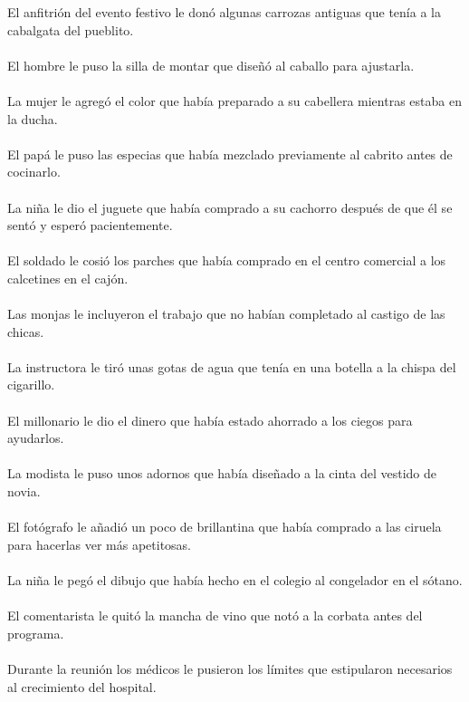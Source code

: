 El anfitri\'{o}n del evento festivo le don\'{o} algunas carrozas antiguas que ten\'{i}a a la cabalgata del pueblito.	\\	\\
El hombre le puso la silla de montar que dise\~{n}\'{o} al caballo para ajustarla.	\\	\\
La mujer le agreg\'{o} el color que hab\'{i}a preparado a su cabellera mientras estaba en la ducha.	\\	\\
El pap\'{a} le puso las especias que hab\'{i}a mezclado previamente al cabrito antes de cocinarlo.	\\	\\
La ni\~{n}a le dio el juguete que hab\'{i}a comprado a su cachorro despu\'{e}s de que \'{e}l se sent\'{o} y esper\'{o} pacientemente.	\\	\\
El soldado le cosi\'{o} los parches que hab\'{i}a comprado en el centro comercial a los calcetines en el caj\'{o}n.	\\	\\
Las monjas le incluyeron el trabajo que no hab\'{i}an completado al castigo de las chicas.	\\	\\
La instructora le tir\'{o} unas gotas de agua que ten\'{i}a en una botella a la chispa del cigarillo.	\\	\\
El millonario le dio el dinero que hab\'{i}a estado ahorrado a los ciegos para ayudarlos.	\\	\\
La modista le puso unos adornos que hab\'{i}a dise\~{n}ado a la cinta del vestido de novia.	\\	\\
El fot\'{o}grafo le a\~{n}adi\'{o} un poco de brillantina que hab\'{i}a comprado a las ciruela para hacerlas ver m\'{a}s apetitosas.	\\	\\
La ni\~{n}a le peg\'{o} el dibujo que hab\'{i}a hecho en el colegio al congelador en el s\'{o}tano.	\\	\\
El comentarista le quit\'{o} la mancha de vino que not\'{o} a la corbata antes del programa.	\\	\\
Durante la reuni\'{o}n los m\'{e}dicos le pusieron los l\'{i}mites que estipularon necesarios al crecimiento del hospital.	\\	\\
